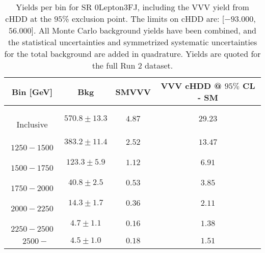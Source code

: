 \begin{table}[!htbp]
    \small
    \center
    \begin{tabular}{c||c|c|c}
    Bin [GeV] & Bkg & SMVVV & \pbox{20cm}{VVV \\ cHDD @ $95\%$ CL - SM \\ }\\
    \hline
    \pbox{20cm}{ ~ \\Inclusive\\ } & $570.8 \pm 13.3$ & $4.87$ & $29.23$\\
    \hline
    \pbox{20cm}{ ~ \\$1250-1500$\\ } & $383.2 \pm 11.4$ & $2.52$ & $13.47$\\
    \hline
    \pbox{20cm}{ ~ \\$1500-1750$\\ } & $123.3 \pm 5.9$ & $1.12$ & $6.91$\\
    \hline
    \pbox{20cm}{ ~ \\$1750-2000$\\ } & $40.8 \pm 2.5$ & $0.53$ & $3.85$\\
    \hline
    \pbox{20cm}{ ~ \\$2000-2250$\\ } & $14.3 \pm 1.7$ & $0.36$ & $2.11$\\
    \hline
    \pbox{20cm}{ ~ \\$2250-2500$\\ } & $4.7 \pm 1.1$ & $0.16$ & $1.38$\\
    \hline
    \pbox{20cm}{ ~ \\$2500-$\\ } & $4.5 \pm 1.0$ & $0.18$ & $1.51$\\
\end{tabular}
    \caption{Yields per bin for SR 0Lepton3FJ, including the VVV yield from cHDD at the $95$\% exclusion point. The limits on cHDD are: [$-93.000$,~$56.000$]. All Monte Carlo background yields have been combined, and the statistical uncertainties and symmetrized systematic uncertainties for the total background are added in quadrature. Yields are quoted for the full Run 2 dataset.}
    \label{tab:0Lepton3FJ$binssignal}
\end{table}
